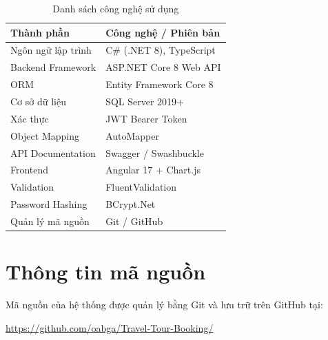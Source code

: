 \begin{table}[H]
\centering
\renewcommand{\arraystretch}{1.4}

\begin{tabular}{|p{6cm}|p{7cm}|}
\hline

\centering \textbf{Thành phần} &
\centering \textbf{Công nghệ / Phiên bản}
\tabularnewline
\hline

Ngôn ngữ lập trình &
C\# (.NET 8), TypeScript
\tabularnewline
\hline

Backend Framework &
ASP.NET Core 8 Web API
\tabularnewline
\hline

ORM &
Entity Framework Core 8
\tabularnewline
\hline

Cơ sở dữ liệu &
SQL Server 2019+
\tabularnewline
\hline

Xác thực &
JWT Bearer Token
\tabularnewline
\hline

Object Mapping &
AutoMapper
\tabularnewline
\hline

API Documentation &
Swagger / Swashbuckle
\tabularnewline
\hline

Frontend &
Angular 17 + Chart.js
\tabularnewline
\hline

Validation &
FluentValidation
\tabularnewline
\hline

Password Hashing &
BCrypt.Net
\tabularnewline
\hline

Quản lý mã nguồn &
Git / GitHub
\tabularnewline
\hline

\end{tabular}

\caption{Danh sách công nghệ sử dụng}
\label{table:congnghe}

\end{table}

\section{Thông tin mã nguồn}

Mã nguồn của hệ thống được quản lý bằng Git và lưu trữ trên GitHub tại:

\begin{center}
\url{https://github.com/oabga/Travel-Tour-Booking/}
\end{center}

\clearpage